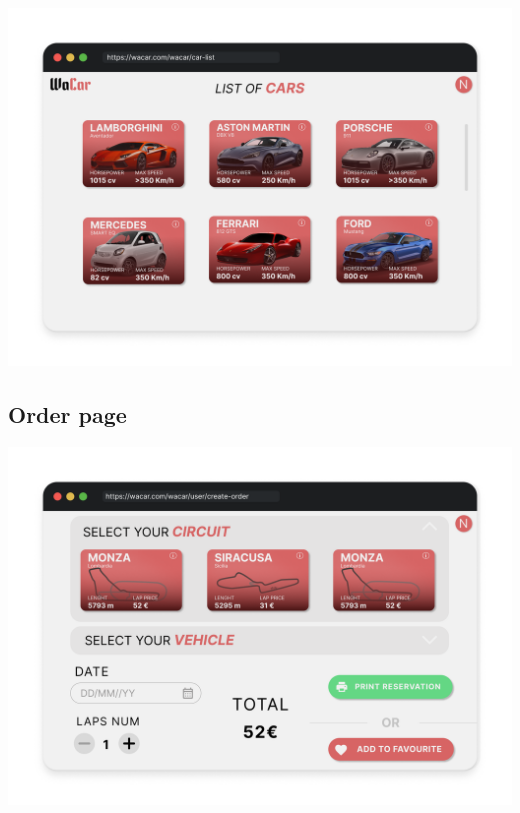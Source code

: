 \begin{center}
	\includegraphics[scale=0.3]{./mockup/car_list.png}
	\label{ERSchema}
\end{center}

\subsection{Order page}

\begin{center}
	\includegraphics[scale=0.3]{./mockup/order_page_all_in_one.png}
	\label{ERSchema}
\end{center}